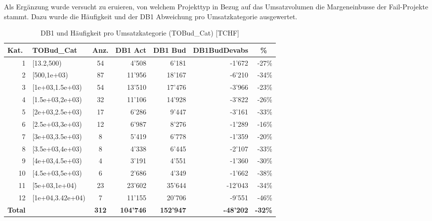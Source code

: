 \newline
Als Ergänzung wurde versucht zu eruieren, von welchem Projekttyp in Bezug auf das Umsatzvolumen die Margeneinbusse der Fail-Projekte stammt. Dazu wurde die Häufigkeit und der DB1 Abweichung pro Umsatzkategorie ausgewertet.
\begin{table}[htpb]
	\centering
	\caption{DB1 und Häufigkeit pro Umsatzkategorie (TOBud\_Cat) [TCHF]}
	\begin{tabular}{lrcrrrr}
		\multicolumn{1}{l}{\textbf{Kat.}} & \multicolumn{1}{l}{\textbf{TOBud\_Cat}} & \multicolumn{1}{c}{\textbf{ Anz.}} & \multicolumn{1}{l}{\textbf{DB1 Act}} & \multicolumn{1}{l}{\textbf{DB1 Bud }} & \multicolumn{1}{l}{\textbf{DB1BudDevabs}} &  \multicolumn{1}{c}{\textbf{\%}}\\\hline
		\multicolumn{1}{r}{1} & \multicolumn{1}{l}{[13.2,500)} & 54    & 4'508 & 6'181 & -1'672 & -27\% \\
		\multicolumn{1}{r}{2} & \multicolumn{1}{l}{[500,1e+03)} & 87    & 11'956 & 18'167 & -6'210 & -34\% \\
		\multicolumn{1}{r}{3} & \multicolumn{1}{l}{[1e+03,1.5e+03)} & 54    & 13'510 & 17'476 & -3'966 & -23\% \\
		\multicolumn{1}{r}{4} & \multicolumn{1}{l}{[1.5e+03,2e+03)} & 32    & 11'106 & 14'928 & -3'822 & -26\% \\
		\multicolumn{1}{r}{5} & \multicolumn{1}{l}{[2e+03,2.5e+03)} & 17    & 6'286 & 9'447 & -3'161 & -33\% \\
		\multicolumn{1}{r}{6} & \multicolumn{1}{l}{[2.5e+03,3e+03)} & 12    & 6'987 & 8'276 & -1'289 & -16\% \\
		\multicolumn{1}{r}{7} & \multicolumn{1}{l}{[3e+03,3.5e+03)} & 8     & 5'419 & 6'778 & -1'359 & -20\% \\
		\multicolumn{1}{r}{8} & \multicolumn{1}{l}{[3.5e+03,4e+03)} & 8     & 4'338 & 6'445 & -2'107 & -33\% \\
		\multicolumn{1}{r}{9} & \multicolumn{1}{l}{[4e+03,4.5e+03)} & 4     & 3'191 & 4'551 & -1'360 & -30\% \\
		\multicolumn{1}{r}{10} & \multicolumn{1}{l}{[4.5e+03,5e+03)} & 6     & 2'686 & 4'349 & -1'662 & -38\% \\
		\multicolumn{1}{r}{11} & \multicolumn{1}{l}{[5e+03,1e+04)} & 23    & 23'602 & 35'644 & -12'043 & -34\% \\
		\multicolumn{1}{r}{12} & \multicolumn{1}{l}{[1e+04,3.42e+04)} & 7     & 11'155 & 20'706 & -9'551 & -46\% \\\hline
		\textbf{Total} &       &    \textbf{312}   & \textbf{104'746} & \textbf{152'947} & \textbf{-48'202} & \textbf{-32\%} \\
	\end{tabular}%
	\label{tab:ftobudcat}%
\end{table}%
